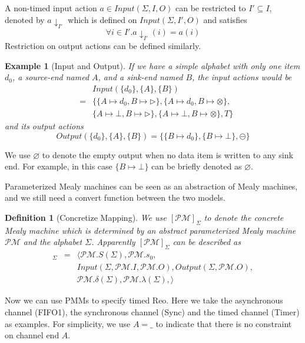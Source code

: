 \documentclass[conference, a4paper]{IEEEtran}
\newtheorem{definition}{Definition}
\newtheorem{example}{Example}
\newcommand{\rblock}[0]{\circleddash}
\newcommand{\rread}[0]{\rhd}
\newcommand{\rnoread}[0]{\otimes}
\newcommand{\smap}[1]{[{#1}]}
\newcommand{\rempty}[0]{\varnothing}
\begin{document}
A non-timed input action $a\in Input(\Sigma,I,O)$ can be restricted to $I'\subseteq I$, denoted by
$a\downarrow_{I'}$ which is defined on $Input(\Sigma,I',O)$ and satisfies
\[
\forall i\in I'. a\downarrow_{I'}(i)=a(i)
\]
Restriction on output actions can be defined similarly.

\begin{example}[Input and Output]
  If we have a simple alphabet with only one item $d_0$, a source-end named $A$, and a
  sink-end named $B$, the input actions would be
  \begin{eqnarray*}
    & & Input(\{d_0\},\{A\},\{B\}) \\
    & = & \{\{A\mapsto d_0,B\mapsto\rread\},\{A\mapsto d_0,B\mapsto\rnoread\}, \\
    & & \{A\mapsto\bot,B\mapsto\rread\}, \{A\mapsto\bot,B\mapsto\rnoread\},T\}
  \end{eqnarray*}
  and its output actions
  \[
  Output(\{d_0\},\{A\},\{B\}) =\{\{B\mapsto d_0\},\{B\mapsto \bot\}, \rblock\}
  \]
\end{example}

We use $\varnothing$ to denote the empty output when no data item is written to any sink end.
For example, in this case $\{B\mapsto\bot\}$ can be briefly denoted as $\rempty$.

Parameterized Mealy machines can be seen as an abstraction of Mealy machines, and we
still need a convert function between the two models.

\begin{definition}[Concretize Mapping]
  We use $\smap{\mathcal{PM}}_{\Sigma}$ to denote the concrete Mealy machine which is determined by
  an abstract parameterized Mealy machine $\mathcal{PM}$ and the alphabet $\Sigma$. Apparently
  $\smap{\mathcal{PM}}_{\Sigma}$ can be described as
  \begin{eqnarray*}
    \smap{\mathcal{PM}}_{\Sigma} &=& 
    \langle
    \mathcal{PM}.S(\Sigma), \mathcal{PM}.s_0, \\
    & & Input(\Sigma, \mathcal{PM}.I, \mathcal{PM}.O), Output(\Sigma, \mathcal{PM}.O), \\
    & & \mathcal{PM}.\delta(\Sigma), \mathcal{PM}.\lambda(\Sigma),
    \rangle
  \end{eqnarray*}
\end{definition}

Now we can use PMMs to specify timed Reo. Here we take the asynchronous channel (FIFO1), the
synchronous channel (Sync) and the timed channel (Timer) as examples. For simplicity, we use $A=\_$
to indicate that there is no constraint on channel end $A$.
\end{document}
